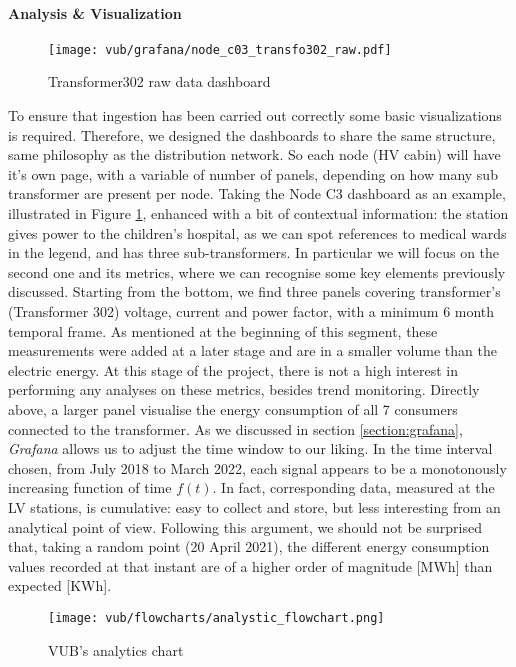 \paragraph{Analysis \& Visualization}
\begin{figure}[ht]
    \texttt{[image: vub/grafana/node\_c03\_transfo302\_raw.pdf]}
    \caption{Transformer302 raw data dashboard}
    \label{fig:vub_raw_rad}
\end{figure}
To ensure that ingestion has been carried out correctly some basic visualizations is required.
Therefore, we designed the dashboards to share the same structure, same philosophy as the distribution network.
So each node (\ac{HV} cabin) will have it's own page, with a variable of number of panels, depending on how many sub transformer are present per node.
Taking the Node C3 dashboard as an example, illustrated in Figure \ref{fig:vub_raw_rad}, enhanced with a bit of contextual information: 
the station gives power to the children's hospital, as we can spot references to medical wards in the legend, and has three sub-transformers.
In particular we will focus on the second one and its metrics, where we can recognise some key elements previously discussed.
Starting from the bottom, we find three panels covering transformer's (Transformer 302) voltage, current and power factor, with a minimum 6 month temporal frame.
As mentioned at the beginning of this segment, these measurements were added at a later stage and are in a smaller volume than the electric energy. 
At this stage of the project, there is not a high interest in performing any analyses on these metrics, besides trend monitoring. 
Directly above, a larger panel visualise the energy consumption of all 7 consumers connected to the transformer.
As we discussed in section \ref{section:grafana}, \textit{Grafana} allows us to adjust the time window to our liking.
In the time interval chosen, from July 2018 to March 2022, each signal appears to be a monotonously increasing function of time $f(t)$. 
In fact, corresponding data, measured at the \ac{LV} stations, is cumulative: easy to collect and store, but less interesting from an analytical point of view. 
Following this argument, we should not be surprised that, taking a random point (20 April 2021), the different energy consumption values recorded at that instant 
are of a higher order of magnitude [MWh] than expected [KWh].
\begin{figure}[ht]
    \texttt{[image: vub/flowcharts/analystic\_flowchart.png]}
    \caption{\ac{VUB}'s analytics chart}
    \label{fig:vub_anal_chart}
\end{figure}

